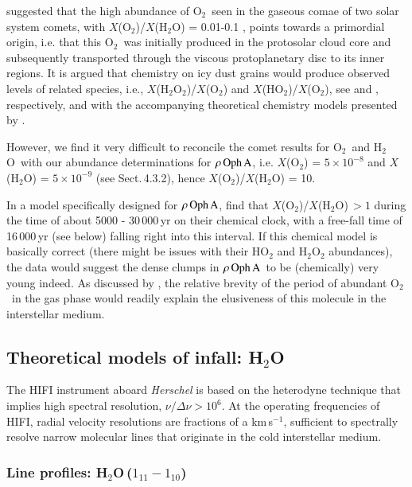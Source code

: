 \documentclass{aa}
\newcommand{\kms}{km\,s$^{-1}$}       %
\newcommand{\water}{H$_{2}$O}
\newcommand{\molo}{O$_{2}$}                     %
\newcommand{\roa}{$\rho \, {\rm Oph \, A}$}
\begin{document}
\citet{taquet2016} suggested that the high abundance of \molo\ seen in the gaseous comae of two solar system comets, with $X$(\molo)/$X$(\water) = 0.01-0.1 \citep{bieler2015,rubin2015}, points towards a primordial origin, i.e. that this \molo\ was initially produced in the protosolar cloud core and subsequently transported through the viscous protoplanetary disc to its inner regions. It is argued that chemistry on icy dust grains would produce observed levels of related species, i.e., $X$(H$_2$O$_2$)/$X$(\molo) and $X$(HO$_2$)/$X$(\molo), see \citet{bergman2011a} and \citet{parise2012}, respectively, and with the accompanying theoretical chemistry models presented by \citet{du2012a, du2012b}.

However, we find it very difficult to reconcile the comet results for \molo\ and \water\ with our abundance determinations for \roa, i.e. $X$(\molo) = $5 \times 10^{-8}$ \citep[][this paper]{larsson2007,liseau2012} and $X$(\water) = $5 \times 10^{-9}$ (see  Sect.\,4.3.2), hence $X$(\molo)/$X$(\water) = 10. 

In a model specifically designed for \roa, \citet[][see their Fig.\,6]{taquet2016} find that $X$(\molo)/$X$(\water)$\,> 1$ during the time of about 5000 -  30\,000\,yr on their chemical clock, with a free-fall time of 16\,000\,yr (see below) falling right into this interval. If this chemical model is basically correct (there might be issues with their HO$_2$ and H$_2$O$_2$ abundances), the data would suggest the dense clumps in \roa\ to be (chemically) very young indeed. As discussed by \citet{liseau2012}, the relative brevity of the period of abundant \molo\ in the gas phase would readily explain the elusiveness of this molecule in the interstellar medium.




\subsection{Theoretical models of infall: \water}
 
 The HIFI instrument aboard {\it Herschel} is based on the heterodyne technique that implies high spectral resolution, $\nu/\Delta \nu > 10^6$. At the operating frequencies of HIFI, radial velocity resolutions are fractions of a \kms,  sufficient to spectrally resolve narrow molecular lines that originate in the cold interstellar medium.
 
 \subsubsection{Line profiles: \water\,($1_{11}-1_{10}$)}
 
\end{document}
